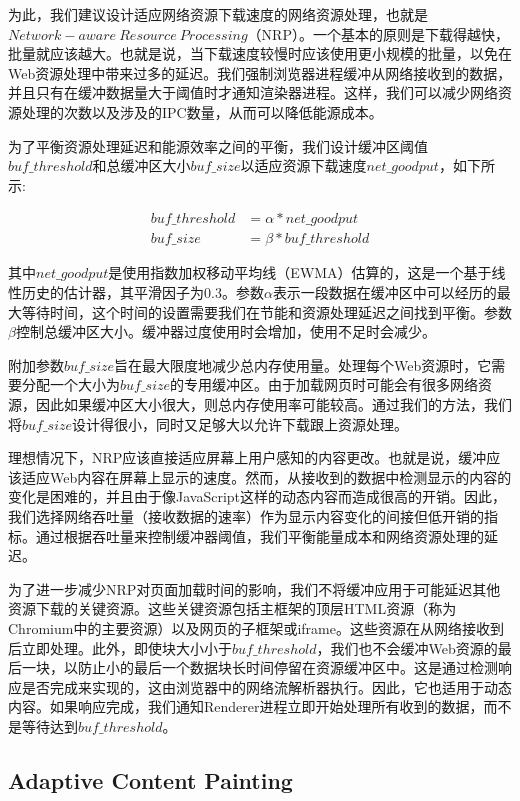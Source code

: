 \documentclass{sig-alternate-05-2015}
\begin{document}
为此，我们建议设计适应网络资源下载速度的网络资源处理，也就是$Network-aware\ Resource\ Processing$（NRP）\cite{1}。一个基本的原则是下载得越快，批量就应该越大。也就是说，当下载速度较慢时应该使用更小规模的批量，以免在Web资源处理中带来过多的延迟。我们强制浏览器进程缓冲从网络接收到的数据，并且只有在缓冲数据量大于阈值时才通知渲染器进程。这样，我们可以减少网络资源处理的次数以及涉及的IPC数量，从而可以降低能源成本。

为了平衡资源处理延迟和能源效率之间的平衡，我们设计缓冲区阈值$buf\_threshold$和总缓冲区大小$buf\_size$以适应资源下载速度$net\_goodput$，如下所示:

\begin{align*}
buf\_threshold &= \alpha * net\_goodput \\
buf\_size &= \beta * buf\_threshold
\end{align*}

其中$net\_goodput$是使用指数加权移动平均线（EWMA）估算的，这是一个基于线性历史的估计器，其平滑因子为$0.3$。\cite{9}\cite{10}参数$\alpha$表示一段数据在缓冲区中可以经历的最大等待时间，这个时间的设置需要我们在节能和资源处理延迟之间找到平衡。参数$\beta$控制总缓冲区大小。缓冲器过度使用时会增加，使用不足时会减少。

附加参数$buf\_size$旨在最大限度地减少总内存使用量。处理每个Web资源时，它需要分配一个大小为$buf\_size$的专用缓冲区。由于加载网页时可能会有很多网络资源，因此如果缓冲区大小很大，则总内存使用率可能较高。通过我们的方法，我们将$buf\_size$设计得很小，同时又足够大以允许下载跟上资源处理。

理想情况下，NRP应该直接适应屏幕上用户感知的内容更改。也就是说，缓冲应该适应Web内容在屏幕上显示的速度。然而，从接收到的数据中检测显示的内容的变化是困难的，并且由于像JavaScript这样的动态内容而造成很高的开销。因此，我们选择网络吞吐量（接收数据的速率）作为显示内容变化的间接但低开销的指标。通过根据吞吐量来控制缓冲器阈值，我们平衡能量成本和网络资源处理的延迟。

为了进一步减少NRP对页面加载时间的影响，我们不将缓冲应用于可能延迟其他资源下载的关键资源。这些关键资源包括主框架的顶层HTML资源（称为Chromium中的主要资源）以及网页的子框架或iframe。这些资源在从网络接收到后立即处理。此外，即使块大小小于$buf\_threshold$，我们也不会缓冲Web资源的最后一块，以防止小的最后一个数据块长时间停留在资源缓冲区中。这是通过检测响应是否完成来实现的，这由浏览器中的网络流解析器执行。因此，它也适用于动态内容。如果响应完成，我们通知Renderer进程立即开始处理所有收到的数据，而不是等待达到$buf\_threshold$。

\subsection{Adaptive Content Painting}
\end{document}

